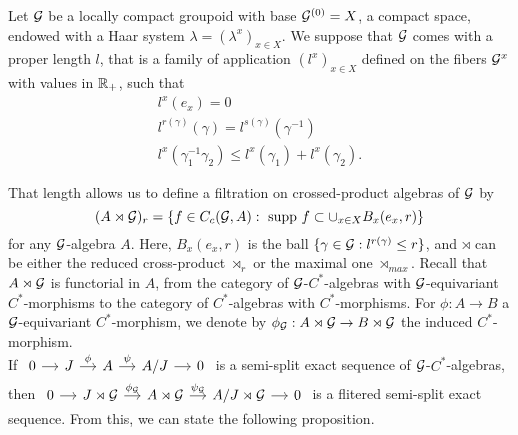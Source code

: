 Let $\mathcal G$ be a locally compact groupoid with base $\mathcal G^{(0)}=X$, a compact space, endowed with a Haar system $\lambda=(\lambda^x)_{x\in X}$. We suppose that $\mathcal G$ comes with a proper length $l$, that is a family of application $(l^x)_{x\in X}$ defined on the fibers $\mathcal G^x$ with values in $\mathbb R_+$, such that
\[\begin{array}{l}
l^x(e_x)=0 \\
l^{r(\gamma)}(\gamma)=l^{s(\gamma)}(\gamma^{-1}) \\
l^x (\gamma_1^{-1} \gamma_2)	\leq l^x(\gamma_1)+l^x(\gamma_2) .	
\end{array}\]

That length allows us to define a filtration on crossed-product algebras of $\mathcal G$ by
\[(A\rtimes \mathcal G)_r = \{f\in C_c(\mathcal G, A) : \text{ supp }f \subset \cup_{x\in X} B_x(e_x, r)\}\]
for any $\mathcal G$-algebra $A$. Here, $B_x(e_x,r)$ is the ball $\{\gamma \in \mathcal G : l^{r(\gamma)}\leq r\}$, and $\rtimes$ can be either the reduced cross-product $\rtimes_r$ or the maximal one $\rtimes_{max}$. Recall that $A\rtimes \mathcal G$ is functorial in $A$, from the category of $\mathcal G$-$C^*$-algebras with $\mathcal G$-equivariant $C^*$-morphisms to the category of $C^*$-algebras with $C^*$-morphisms. For $\phi : A\rightarrow B$ a $\mathcal G$-equivariant $C^*$-morphism, we denote by $\phi_\mathcal G : A\rtimes\mathcal G \rightarrow B\rtimes\mathcal G$ the induced $C^*$-morphism.\\

If $\begin{tikzcd}[column sep = small]
0 \arrow{r} & J\arrow{r}{\phi}& A \arrow{r}{\psi} & A/J \arrow{r} & 0
\end{tikzcd}$ is a semi-split exact sequence of $\mathcal G$-$C^*$-algebras, then 
$\begin{tikzcd}[column sep = small]
0 \arrow{r} & J\rtimes \G\arrow{r}{\phi_\G}& A\rtimes \G \arrow{r}{\psi_\G} & A/J\rtimes \G \arrow{r} & 0
\end{tikzcd}$ is a flitered semi-split exact sequence. From this, we can state the following proposition.\\

